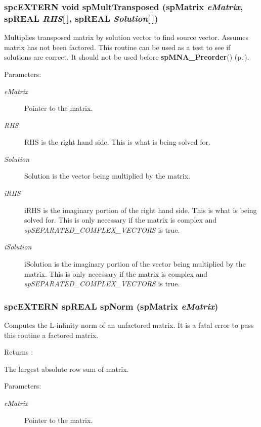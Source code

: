 \subsubsection{\setlength{\rightskip}{0pt plus 5cm}spc\-EXTERN void sp\-Mult\-Transposed ({\bf sp\-Matrix} {\em e\-Matrix}, sp\-REAL {\em RHS}[$\,$], sp\-REAL {\em Solution}[$\,$])}\label{spMatrix_8h_a59}


Multiplies transposed matrix by solution vector to find source vector. Assumes matrix has not been factored. This routine can be used as a test to see if solutions are correct. It should not be used before {\bf sp\-MNA\_\-Preorder}() {\rm (p.\,\pageref{spMatrix_8h_a44})}.\begin{Desc}
\item[Parameters: ]\par
\begin{description}
\item[{\em 
e\-Matrix}]Pointer to the matrix. \item[{\em 
RHS}]RHS is the right hand side. This is what is being solved for. \item[{\em 
Solution}]Solution is the vector being multiplied by the matrix. \item[{\em 
i\-RHS}]i\-RHS is the imaginary portion of the right hand side. This is what is being solved for. This is only necessary if the matrix is complex and {\em sp\-SEPARATED\_\-COMPLEX\_\-VECTORS} is true. \item[{\em 
i\-Solution}]i\-Solution is the imaginary portion of the vector being multiplied by the matrix. This is only necessary if the matrix is complex and {\em sp\-SEPARATED\_\-COMPLEX\_\-VECTORS} is true. \end{description}
\end{Desc}
\subsubsection{\setlength{\rightskip}{0pt plus 5cm}spc\-EXTERN sp\-REAL sp\-Norm ({\bf sp\-Matrix} {\em e\-Matrix})}\label{spMatrix_8h_a45}


Computes the L-infinity norm of an unfactored matrix. It is a fatal error to pass this routine a factored matrix.

\begin{Desc}
\item[Returns :]\par
 The largest absolute row sum of matrix.\end{Desc}
\begin{Desc}
\item[Parameters: ]\par
\begin{description}
\item[{\em 
e\-Matrix}]Pointer to the matrix. \end{description}
\end{Desc}
